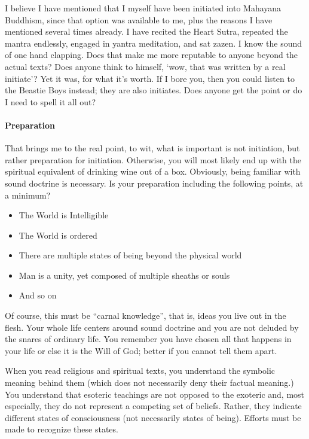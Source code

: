 I believe I have mentioned that I myself have been initiated into Mahayana Buddhism, since that option was available to me, plus the reasons I have mentioned several times already. I have recited the Heart Sutra, repeated the mantra endlessly, engaged in yantra meditation, and sat zazen. I know the sound of one hand clapping. Does that make me more reputable to anyone beyond the actual texts? Does anyone think to himself, `wow, that was written by a real initiate'? Yet it was, for what it's worth. If I bore you, then you could listen to the Beastie Boys instead; they are also initiates. Does anyone get the point or do I need to spell it all out?

\paragraph{Preparation}


That brings me to the real point, to wit, what is important is not initiation, but rather preparation for initiation. Otherwise, you will most likely end up with the spiritual equivalent of drinking wine out of a box. Obviously, being familiar with sound doctrine is necessary. Is your preparation including the following points, at a minimum?

\begin{itemize}


\item The World is Intelligible

\item The World is ordered

\item There are multiple states of being beyond the physical world

\item Man is a unity, yet composed of multiple sheaths or souls

\item And so on
\end{itemize}


Of course, this must be ``carnal knowledge'', that is, ideas you live out in the flesh. Your whole life centers around sound doctrine and you are not deluded by the snares of ordinary life. You remember you have chosen all that happens in your life or else it is the Will of God; better if you cannot tell them apart.

When you read religious and spiritual texts, you understand the symbolic meaning behind them (which does not necessarily deny their factual meaning.) You understand that esoteric teachings are not opposed to the exoteric and, most especially, they do not represent a competing set of beliefs. Rather, they indicate different states of consciousness (not necessarily states of being). Efforts must be made to recognize these states.


